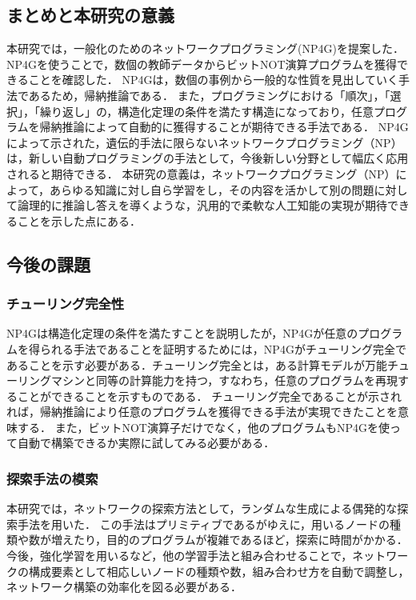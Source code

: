 \documentclass[exploratorypaper]{jsaiart} %
\begin{document}
\subsection{まとめと本研究の意義}
本研究では，一般化のためのネットワークプログラミング(NP4G)を提案した．NP4Gを使うことで，数個の教師データからビットNOT演算プログラムを獲得できることを確認した．
NP4Gは，数個の事例から一般的な性質を見出していく手法であるため，帰納推論である．
また，プログラミングにおける「順次」，「選択」，「繰り返し」の，構造化定理の条件を満たす構造になっており，任意プログラムを帰納推論によって自動的に獲得することが期待できる手法である．
NP4Gによって示された，遺伝的手法に限らないネットワークプログラミング（NP）は，新しい自動プログラミングの手法として，今後新しい分野として幅広く応用されると期待できる．
本研究の意義は，ネットワークプログラミング（NP）によって，あらゆる知識に対し自ら学習をし，その内容を活かして別の問題に対して論理的に推論し答えを導くような，汎用的で柔軟な人工知能の実現が期待できることを示した点にある．
\subsection{今後の課題}
\subsubsection{チューリング完全性}
NP4Gは構造化定理の条件を満たすことを説明したが，NP4Gが任意のプログラムを得られる手法であることを証明するためには，NP4Gがチューリング完全であることを示す必要がある．チューリング完全とは，ある計算モデルが万能チューリングマシンと同等の計算能力を持つ，すなわち，任意のプログラムを再現することができることを示すものである．
チューリング完全であることが示されれば，帰納推論により任意のプログラムを獲得できる手法が実現できたことを意味する．
また，ビットNOT演算子だけでなく，他のプログラムもNP4Gを使って自動で構築できるか実際に試してみる必要がある．
\subsubsection{探索手法の模索}
本研究では，ネットワークの探索方法として，ランダムな生成による偶発的な探索手法を用いた．
この手法はプリミティブであるがゆえに，用いるノードの種類や数が増えたり，目的のプログラムが複雑であるほど，探索に時間がかかる．
今後，強化学習を用いるなど，他の学習手法と組み合わせることで，ネットワークの構成要素として相応しいノードの種類や数，組み合わせ方を自動で調整し，ネットワーク構築の効率化を図る必要がある．
\end{document}
